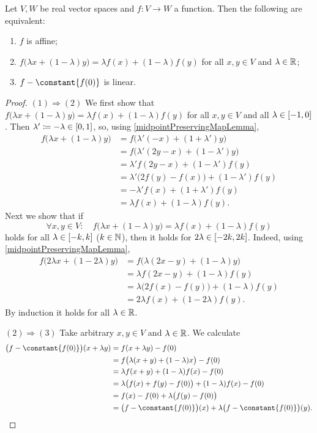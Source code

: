 \begin{lemma}
Let $V,W$ be real vector spaces and $f: V\to W$ a function. Then the following are equivalent:
\begin{enumerate}
\item $f$ is affine;
\item $f\big(\lambda x + (1-\lambda)y\big) = \lambda f(x) + (1-\lambda)f(y)$ for all $x,y\in V$ and $\lambda \in \mathbb{R}$;
\item $f-\constant{f(0)}$ is linear.
\end{enumerate}
\end{lemma}
\begin{proof}
$(1)\Rightarrow (2)$ We first show that $f\big(\lambda x + (1-\lambda)y\big) = \lambda f(x) + (1-\lambda)f(y)$ for all $x,y\in V$ and all $\lambda \in \interval{-1,0}$. Then $\lambda'\defeq -\lambda \in \interval{0,1}$, so, using \ref{midpointPreservingMapLemma},
\begin{align*}
f\big(\lambda x + (1-\lambda)y\big) &= f\big(\lambda' (-x) + (1+\lambda')y\big) \\
&= f\big(\lambda' (2y-x) + (1-\lambda')y\big) \\
&= \lambda'f(2y-x) + (1-\lambda')f(y) \\
&= \lambda'\big(2f(y)-f(x)\big) + (1-\lambda')f(y) \\
&= -\lambda'f(x) + (1+\lambda')f(y) \\
&= \lambda f(x) + (1-\lambda)f(y).
\end{align*}
Next we show that if
\[ \forall x,y\in V: \quad f\big(\lambda x + (1-\lambda)y\big) = \lambda f(x) + (1-\lambda)f(y) \]
holds for all $\lambda \in \interval{-k,k}$ ($k\in\mathbb{N}$), then it holds for $2\lambda\in \interval{-2k,2k}$. Indeed, using \ref{midpointPreservingMapLemma},
\begin{align*}
f\big(2\lambda x + (1-2\lambda)y\big) &= f\big(\lambda (2x-y) + (1-\lambda)y\big) \\
&= \lambda f(2x-y) + (1-\lambda)f(y) \\
&= \lambda \big(2f(x) - f(y)\big) + (1-\lambda)f(y) \\
&= 2\lambda f(x) + (1-2\lambda)f(y).
\end{align*}
By induction it holds for all $\lambda\in \mathbb{R}$.

$(2) \Rightarrow (3)$ Take arbitrary $x,y\in V$ and $\lambda \in \mathbb{R}$. We calculate
\begin{align*}
\big(f - \constant{f(0)}\big)(x+\lambda y) &= f(x+\lambda y)- f(0) \\
&= f\big(\lambda (x+ y) + (1-\lambda)x\big)- f(0) \\
&= \lambda f(x+y) + (1-\lambda)f(x) - f(0) \\
&= \lambda \big(f(x)+f(y)-f(0)\big) + (1-\lambda)f(x) - f(0) \\
&= f(x) - f(0) + \lambda \big(f(y)-f(0)\big) \\
&= \big(f - \constant{f(0)}\big)(x)+ \lambda\big(f - \constant{f(0)}\big)(y).
\end{align*}


\end{proof}
